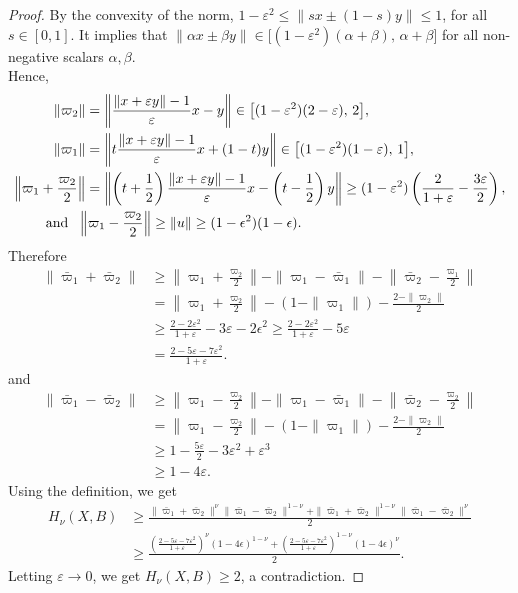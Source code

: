 \documentclass[preprint,12pt]{elsarticle}
\numberwithin{equation}{section}
\begin{document}
\begin{proof}
By the convexity of the norm,
$1-\varepsilon^2 \le \|s x \pm (1-s)y\| \le 1$, for all  $s\in[0,1]$. It implies that
$\|\alpha x \pm \beta y\|
\in \bigl[(1-\varepsilon^2)(\alpha+\beta),\,\alpha+\beta\bigr]$
for all non-negative scalars $\alpha,\beta$.\\
Hence,
\begin{align*}
\|\varpi_2\|&
=\left\|\frac{\|x+\varepsilon y\|-1}{\varepsilon}x-y\right\|
\in \bigl[(1-\varepsilon^2)(2-\varepsilon),\,2\bigr],\\
\|\varpi_1\|&
=\left\|t\frac{\|x+\varepsilon y\|-1}{\varepsilon}x+(1-t)y\right\|
\in \bigl[(1-\varepsilon^2)(1-\varepsilon),\,1\bigr],\\
\left\|\varpi_1+\frac{\varpi_2}{2}\right\|&
=\left\|\left(t+\frac12\right)\frac{\|x+\varepsilon y\|-1}{\varepsilon}x
-\left(t-\frac12\right)y\right\|
\ge (1-\varepsilon^2)\left(\frac{2}{1+\varepsilon}-\frac{3\varepsilon}{2}\right),\\
&\hspace{-1cm}\text{and}~~
\left\|\varpi_1-\frac{\varpi_2}{2}\right\|\geq \|u\|\geq (1-\epsilon^2)(1-\epsilon).
\end{align*}
Therefore
\begin{align*}
\|\bar \varpi_1+\bar \varpi_2\|
&\ge \left\|\varpi_1+\frac{\varpi_2}{2}\right\|
 - \|\varpi_1-\bar \varpi_1\| - \left\|\bar \varpi_2-\frac{\varpi_1}{2}\right\| \\
&= \left\|\varpi_1+\frac{\varpi_2}{2}\right\| - (1-\|\varpi_1\|) - \frac{2-\|\varpi_2\|}{2} \\
&\ge \frac{2-2\varepsilon^2}{1+\varepsilon} - 3\varepsilon-2\epsilon^2\geq \frac{2-2\varepsilon^2}{1+\varepsilon} - 5\varepsilon\\
&=\frac{2-5\varepsilon-7\varepsilon^2}{1+\varepsilon}.
\end{align*}
and 
\begin{align*}
 \|\bar \varpi_1-\bar \varpi_2\| &\ge \left\|\varpi_1-\frac{\varpi_2}{2}\right\|
 - \|\varpi_1-\bar \varpi_1\| - \left\|\bar \varpi_2-\frac{\varpi_2}{2}\right\| \\  
&= \left\|\varpi_1-\frac{\varpi_2}{2}\right\| - (1-\|\varpi_1\|) - \frac{2-\|\varpi_2\|}{2} \\ 
&\geq 1-\frac{5\varepsilon}{2}-3\varepsilon^2+\varepsilon^3\\
&\geq 1-4\varepsilon.
\end{align*}
Using the definition, we get
\begin{align*}
H_\nu(X,B)&\geq\frac{\|\bar \varpi_1+\bar \varpi_2\|^{\nu}\|\bar \varpi_1-\bar \varpi_2\|^{1-\nu} + \|\bar \varpi_1+\bar \varpi_2\|^{1-\nu}\|\bar \varpi_1-\bar \varpi_2\|^{\nu}}{2}\\
&\geq \frac{(\frac{2-5\varepsilon-7\varepsilon^2}{1+\varepsilon})^\nu(1-4\epsilon)^{1-\nu}+(\frac{2-5\varepsilon-7\varepsilon^2}{1+\varepsilon})^{1-\nu}(1-4\epsilon)^\nu}{2}.
\end{align*}
Letting $\varepsilon\rightarrow 0$, we get $H_\nu(X,B)\geq 2$, a contradiction.
\end{proof}
\end{document}
